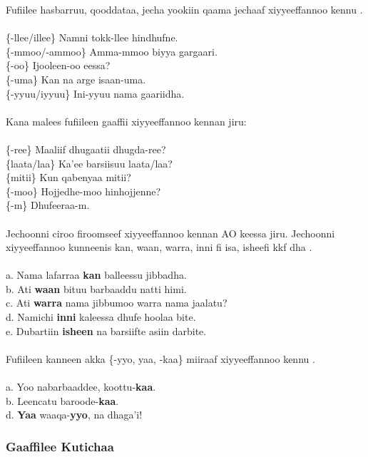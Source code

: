 \documentclass[11pt,b5paper]{book}
\begin{document}
Fufiilee hasbarruu, qooddataa, jecha yookiin qaama jechaaf xiyyeeffannoo kennu \cite[pp.61-62]{griefenow2001grammatical}. \\
\\
\{-llee/illee\} Namni tokk-llee hindhufne.\\
\{-mmoo/-ammoo\} Amma-mmoo biyya gargaari.\\
\{-oo\} Ijooleen-oo eessa?\\
\{-uma\} Kan na arge isaan-uma.\\
\{-yyuu/iyyuu\} Ini-yyuu nama gaariidha.\\
\\
Kana malees fufiileen gaaffii xiyyeeffannoo kennan jiru:\\
\\
\{-ree\} Maaliif dhugaatii dhugda-ree?\\
\{laata/laa\} Ka’ee barsiisuu laata/laa?\\
\{mitii\} Kun qabenyaa mitii?\\
\{-moo\} Hojjedhe-moo hinhojjenne?\\
\{-m\} Dhufeeraa-m.\\
\\
Jechoonni ciroo firoomseef xiyyeeffannoo kennan AO keessa jiru. Jechoonni xiyyeeffannoo kunneenis kan, waan, warra,
inni fi isa, isheefi kkf dha \cite[pp.63-64]{griefenow2001grammatical}.\\
\\
a. Nama lafarraa \textbf{kan} balleessu jibbadha.\\
b. Ati \textbf{waan} bituu barbaaddu natti himi. \\
c. Ati \textbf{warra} nama jibbumoo warra nama jaalatu?\\
d. Namichi \textbf{inni} kaleessa dhufe hoolaa bite.\\
e. Dubartiin \textbf{isheen} na barsiifte asiin darbite.\\
\\

Fufiileen kanneen akka \{-yyo, yaa, -kaa\} miiraaf xiyyeeffannoo kennu \cite[pp.63-64]{griefenow2001grammatical}.\\
\\
a. Yoo nabarbaaddee, koottu-\textbf{kaa}.\\
b. Leencatu baroode-\textbf{kaa}.\\
d. \textbf{Yaa} waaqa-\textbf{yyo}, na dhaga’i!

\subsubsection{Gaaffilee Kutichaa }
\end{document}
